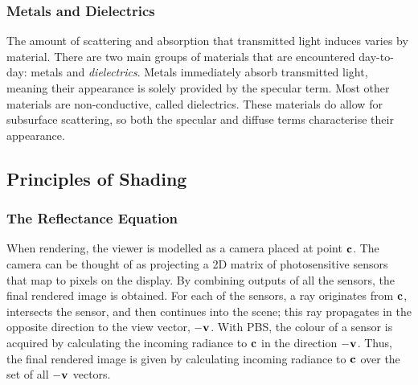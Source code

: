 \vspace{-0.5cm}

\subsubsection{Metals and Dielectrics}

The amount of scattering and absorption that transmitted light induces varies by material. There are two main groups of materials that are encountered day-to-day: metals and \textit{dielectrics}. Metals immediately absorb transmitted light, meaning their appearance is solely provided by the specular term. Most other materials are non-conductive, called dielectrics. These materials do allow for subsurface scattering, so both the specular and diffuse terms characterise their appearance.

\subsection{Principles of Shading} \label{PrinciplesOfShading}

\subsubsection{The Reflectance Equation}

When rendering, the viewer is modelled as a camera placed at point \begin{math}\mathbf{c}\end{math}. The camera can be thought of as projecting a 2D matrix of photosensitive sensors that map to pixels on the display. By combining outputs of all the sensors, the final rendered image is obtained. For each of the sensors, a ray originates from \begin{math}\mathbf{c}\end{math}, intersects the sensor, and then continues into the scene; this ray propagates in the opposite direction to the view vector, \begin{math}\mathbf{-v}\end{math}. With PBS, the colour of a sensor is acquired by calculating the incoming radiance to \begin{math}\mathbf{c}\end{math} in the direction \begin{math}\mathbf{-v}\end{math}. Thus, the final rendered image is given by calculating incoming radiance to \begin{math}\mathbf{c}\end{math} over the set of all \begin{math}\mathbf{-v}\end{math} vectors.

